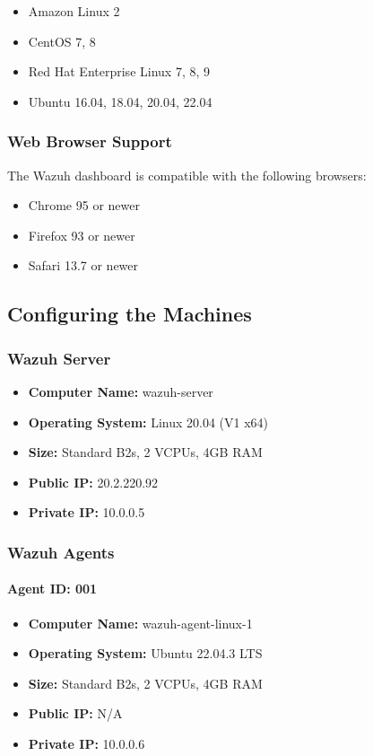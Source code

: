 \begin{itemize}
\item Amazon Linux 2
\item CentOS 7, 8
\item Red Hat Enterprise Linux 7, 8, 9
\item Ubuntu 16.04, 18.04, 20.04, 22.04
\end{itemize}

\subsubsection{Web Browser Support}

The Wazuh dashboard is compatible with the following browsers:

\begin{itemize}
\item Chrome 95 or newer
\item Firefox 93 or newer
\item Safari 13.7 or newer
\end{itemize}

\subsection{Configuring the Machines}

\subsubsection{Wazuh Server}
\begin{itemize}
    \item \textbf{Computer Name:} wazuh-server
    \item \textbf{Operating System:} Linux 20.04 (V1 x64)
    \item \textbf{Size:} Standard B2s, 2 VCPUs, 4GB RAM
    \item \textbf{Public IP:} 20.2.220.92
    \item \textbf{Private IP:} 10.0.0.5
\end{itemize}

\subsubsection{Wazuh Agents}
\label{installed-agents}
\paragraph{Agent ID: 001}
\begin{itemize}
    \item \textbf{Computer Name:} wazuh-agent-linux-1
    \item \textbf{Operating System:} Ubuntu 22.04.3 LTS
    \item \textbf{Size:} Standard B2s, 2 VCPUs, 4GB RAM
    \item \textbf{Public IP:} N/A
    \item \textbf{Private IP:} 10.0.0.6
\end{itemize}

